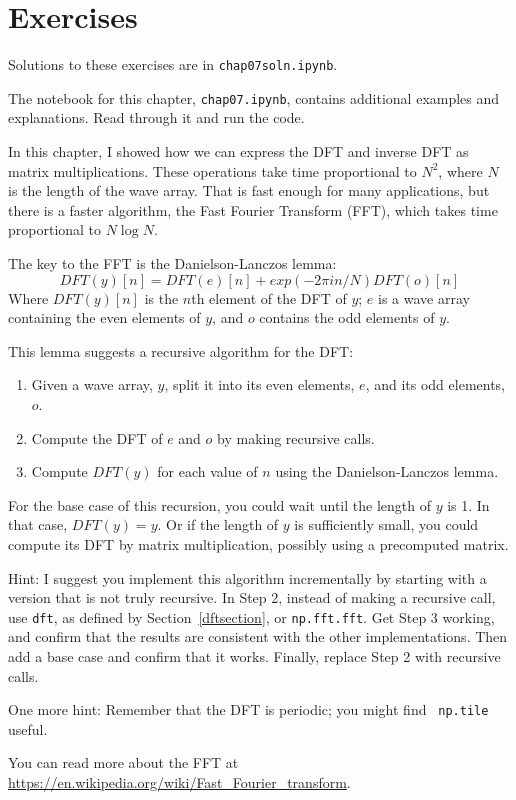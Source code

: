 \documentclass[12pt]{book}
\begin{document}
\section{Exercises}

Solutions to these exercises are in {\tt chap07soln.ipynb}.


\begin{exercise}
The notebook for this chapter, {\tt chap07.ipynb}, contains
additional examples and explanations.  Read through it and run
the code.
\end{exercise}


\begin{exercise}
In this chapter, I showed how we can express the DFT and inverse DFT
as matrix multiplications.  These operations take time proportional to
$N^2$, where $N$ is the length of the wave array.  That is fast enough
for many applications, but there is a faster
algorithm, the Fast Fourier Transform (FFT), which takes time
proportional to $N \log N$.

The key to the FFT is the Danielson-Lanczos lemma:
%
\[ DFT(y)[n] = DFT(e)[n] + exp(-2 \pi i n / N) DFT(o)[n] \]
%
Where $ DFT(y)[n]$ is the $n$th element of the DFT of $y$; $e$ is a
wave array containing the even elements of $y$, and $o$ contains the
odd elements of $y$.

This lemma suggests a recursive algorithm for the DFT:

\begin{enumerate}

\item Given a wave array, $y$, split it into its even elements, $e$,
  and its odd elements, $o$.

\item Compute the DFT of $e$ and $o$ by making recursive calls.

\item Compute $DFT(y)$ for each value of $n$ using the
  Danielson-Lanczos lemma.

\end{enumerate}

For the base case of this recursion, you could wait until the length
of $y$ is 1.  In that case, $DFT(y) = y$.  Or if the length of $y$
is sufficiently small, you could compute its DFT by matrix multiplication,
possibly using a precomputed matrix.

Hint: I suggest you implement this algorithm incrementally by starting
with a version that is not truly recursive.  In Step 2, instead of
making a recursive call, use {\tt dft}, as defined by
Section~\ref{dftsection}, or {\tt np.fft.fft}.  Get Step 3 working,
and confirm that the results are consistent with the other
implementations.  Then add a base case and confirm that it works.
Finally, replace Step 2 with recursive calls.

One more hint: Remember that the DFT is periodic; you might find {\tt
  np.tile} useful.

You can read more about the FFT at
\url{https://en.wikipedia.org/wiki/Fast_Fourier_transform}.

\end{exercise}
\end{document}
